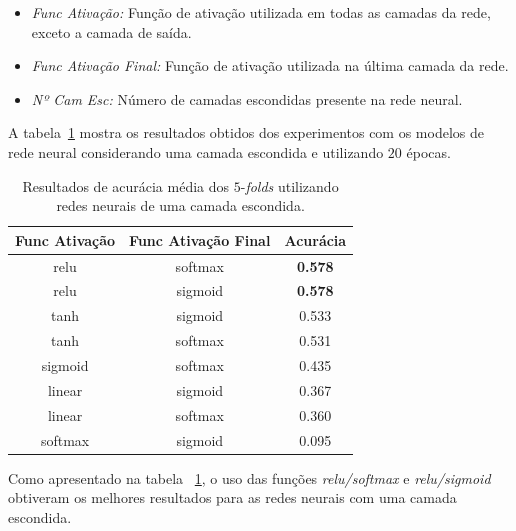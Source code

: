\documentclass[conference]{IEEEtran}
\begin{document}
\begin{itemize}
	\item \small \emph{Func Ativação:} Função de ativação utilizada em todas as camadas da rede, exceto a camada de saída.
	\item \small \emph{Func Ativação Final:} Função de ativação utilizada na última camada da rede.
	\item \small \emph{Nº Cam Esc:} Número de camadas escondidas presente na rede neural.
\end{itemize}

 A tabela~\ref{tab:1hl} mostra os resultados obtidos dos experimentos com os modelos de rede neural considerando uma camada escondida e utilizando $20$ épocas.

\begin{table}[h!]
	\centering
	
	\begin{tabular}{ccc} \toprule
		\textbf{Func Ativação} & \textbf{Func Ativação Final} & \textbf{Acurácia} \\ \toprule 
		relu                   & softmax                      & \textbf{0.578}             \\
		relu                   & sigmoid                      & \textbf{0.578}             \\
		tanh                   & sigmoid                      & 0.533             \\
		tanh                   & softmax                      & 0.531             \\	
		sigmoid                & softmax                      & 0.435             \\
		linear                 & sigmoid                      & 0.367             \\
		linear                 & softmax                      & 0.360             \\
		
		softmax                & sigmoid                      & 0.095      \\ \bottomrule      
	\end{tabular}
	\caption{\small Resultados de acurácia média dos $5$-\emph{folds} utilizando redes neurais de uma camada escondida.}
	\label{tab:1hl}
\end{table}

Como apresentado na tabela ~\ref{tab:1hl}, o uso das funções \emph{relu/softmax} e \emph{relu/sigmoid} obtiveram os melhores resultados para as redes neurais com uma camada escondida.
\end{document}
